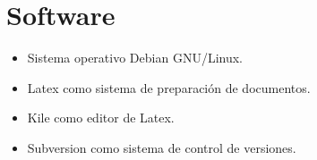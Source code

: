 \section{Software}

\begin{itemize}
 \item Sistema operativo Debian GNU/Linux.
 \item Latex como sistema de preparación de documentos.
 \item Kile como editor de Latex.
 \item Subversion como sistema de control de versiones.
\end{itemize}

